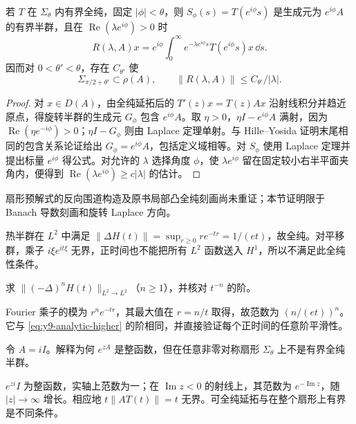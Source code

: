 \begin{proposition}
若 $T$ 在 $\Sigma_\theta$ 内有界全纯，固定 $|\phi|<\theta$，则 $S_\phi(s)=T(e^{i\phi}s)$ 是生成元为 $e^{i\phi}A$ 的有界半群，且在 $\operatorname{Re}(\lambda e^{i\phi})>0$ 时
\begin{equation}\label{eq:y9-rotated-laplace}
 R(\lambda,A)x=e^{i\phi}\int_0^\infty
 e^{-\lambda e^{i\phi}s}T(e^{i\phi}s)x\,\dd s.
\end{equation}
因而对 $0<\theta'<\theta$，存在 $C_{\theta'}$ 使
\[
 \Sigma_{\pi/2+\theta'}\subset\rho(A),\qquad
 \|R(\lambda,A)\|\le C_{\theta'}/|\lambda|.
\]
\end{proposition}
\begin{proof}
对 $x\in D(A)$，由全纯延拓后的 $T'(z)x=T(z)Ax$ 沿射线积分并趋近原点，得旋转半群的生成元 $G_\phi$ 包含 $e^{i\phi}A$。取 $\eta>0$，$\eta I-e^{i\phi}A$ 满射，因为 $\operatorname{Re}(\eta e^{-i\phi})>0$；$\eta I-G_\phi$ 则由 Laplace 定理单射。与 Hille--Yosida 证明末尾相同的包含关系论证给出 $G_\phi=e^{i\phi}A$，包括定义域相等。对 $S_\phi$ 使用 Laplace 定理并提出标量 $e^{i\phi}$ 得公式。对允许的 $\lambda$ 选择角度 $\phi$，使 $\lambda e^{i\phi}$ 留在固定较小右半平面夹角内，便得到 $\operatorname{Re}(\lambda e^{i\phi})\ge c|\lambda|$ 的估计。
\end{proof}

扇形预解式的反向围道构造及原书局部凸全纯刻画尚未重证；本节证明限于 Banach 导数刻画和旋转 Laplace 方向。

\begin{example}
热半群在 $L^2$ 中满足 $\|\Delta H(t)\|=\sup_{r\ge0}re^{-tr}=1/(et)$，故全纯。对平移群，乘子 $i\xi e^{it\xi}$ 无界，正时间也不能把所有 $L^2$ 函数送入 $H^1$，所以不满足此全纯性条件。
\end{example}

\begin{exercise}[热流的高阶估计]\label{ex:y9-heat-smoothing}
求 $\|(-\Delta)^nH(t)\|_{L^2\to L^2}$（$n\ge1$），并核对 $t^{-n}$ 的阶。
\end{exercise}
\begin{solution}
Fourier 乘子的模为 $r^ne^{-tr}$，其最大值在 $r=n/t$ 取得，故范数为 $(n/(et))^n$。它与 \eqref{eq:y9-analytic-higher} 的阶相同，并直接验证每个正时间的任意阶平滑性。
\end{solution}

\begin{exercise}[有界生成元未必给出有界全纯延拓]\label{ex:y9-bounded-analytic}
令 $A=iI$。解释为何 $e^{zA}$ 是整函数，但在任意非零对称扇形 $\Sigma_\theta$ 上不是有界全纯半群。
\end{exercise}
\begin{solution}
$e^{zi}I$ 为整函数，实轴上范数为一；在 $\operatorname{Im}z<0$ 的射线上，其范数为 $e^{-\operatorname{Im}z}$，随 $|z|\to\infty$ 增长。相应地 $t\|AT(t)\|=t$ 无界。可全纯延拓与在整个扇形上有界是不同条件。
\end{solution}
